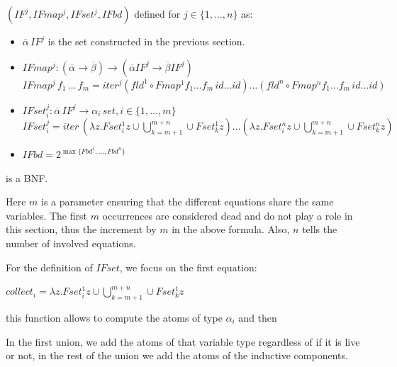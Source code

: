 \begin{thm}
	$(IF^ j, IFmap^ j, IFset^ j, IFbd)$ defined for $j \in \{1,\ldots,n\}$ as:
	
	\begin{itemize}
		\item $\overline{\alpha} \, IF^j$ is the set constructed in the previous section.
		\item $IFmap^j: (\overline{\alpha} \to \overline{\beta}) \to (\overline{\alpha} IF^j \to \overline{\beta} IF^j)$ \\
			  $IFmap^j \, f_1 \, \ldots \, f_m = iter^j (fld^1 \circ Fmap^1 f_1 \ldots f_m \, id \ldots id) \ldots (fld^ n \circ Fmap^ n f_1 \ldots f_m \, id \ldots id)$
		\item $IFset_i^j: \overline{\alpha} \, IF^j \to \alpha_i \, set, i \in \{1,\ldots,m\}$ \\
			  $IFset_i^j = iter \, (\lambda z. Fset_i^1 z \cup \bigcup_{k=m+1}^{m+n} \cup Fset_k^1 z) \ldots (\lambda z. Fset_i^n z \cup \bigcup_{k=m+1}^{m+n} \cup Fset_k^n z)$ 
		\item $IFbd = 2^{\max\{Fbd^1,\ldots,Fbd^n\}}$
	\end{itemize}

is a BNF.
\end{thm}

Here $m$ is a parameter ensuring that the different equations share the same variables. The first $m$ occurrences are considered dead and do not play a role in this section, thus the increment by $m$ in the above formula. Also, $n$ tells the number of involved equations.

For the definition of $IFset$, we focus on the first equation:

$collect_i = \lambda z. Fset_i^1 z \cup \bigcup_{k=m+1}^{m+n} \cup Fset_k^1 z$ 

this function allows to compute the atoms of type $\alpha_i$ and then 

In the first union, we add the atoms of that variable type regardless of if it is live or not, in the rest of the union we add the atoms of the inductive components.


